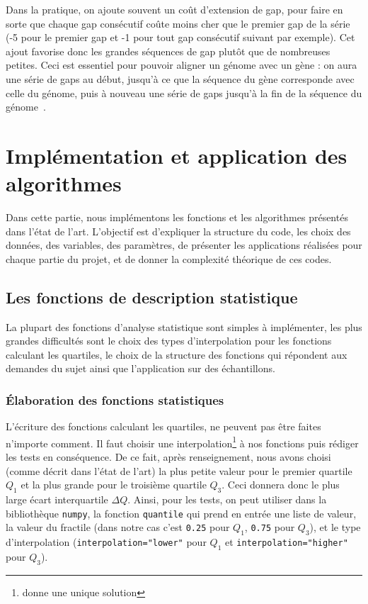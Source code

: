 \documentclass[12pt]{article}
\begin{document}
Dans la pratique, on ajoute souvent un coût d'extension de gap, pour faire en sorte que chaque gap consécutif coûte moins cher que le premier gap de la série (-5 pour le premier gap et -1 pour tout gap consécutif suivant par exemple). Cet ajout favorise donc les grandes séquences de gap plutôt que de nombreuses petites. Ceci est essentiel pour pouvoir aligner un génome avec un gène : on aura une série de gaps au début, jusqu'à ce que la séquence du gène corresponde avec celle du génome, puis à nouveau une série de gaps jusqu'à la fin de la séquence du génome~\cite{alignmit}.\\

\newpage

\section{Implémentation et application des algorithmes} 
Dans cette partie, nous implémentons les fonctions et les algorithmes présentés dans l'état de l'art. L'objectif est d'expliquer la structure du code, les choix des données, des variables, des paramètres, de présenter les applications réalisées pour chaque partie du projet, et de donner la complexité théorique de ces codes.



\subsection{Les fonctions de description statistique}
La plupart des fonctions d'analyse statistique sont simples à implémenter, les plus grandes difficultés sont le choix des types d'interpolation pour les fonctions calculant les quartiles, le choix de la structure des fonctions qui répondent aux demandes du sujet ainsi que l'application sur des échantillons.




\subsubsection{Élaboration des fonctions statistiques}
L'écriture des fonctions calculant les quartiles, ne peuvent pas être faites n'importe comment. Il faut choisir une interpolation\footnote{donne une unique solution} à nos fonctions puis rédiger les tests en conséquence. De ce fait, après renseignement, nous avons choisi (comme décrit dans l'état de l'art) la plus petite valeur pour le premier quartile $Q_1$ et la plus grande pour le troisième quartile $Q_3$. Ceci donnera donc le plus large écart interquartile $\Delta Q$. Ainsi, pour les tests, on peut utiliser dans la bibliothèque \texttt{numpy}, la fonction \texttt{quantile} qui prend en entrée une liste de valeur, la valeur du fractile (dans notre cas c'est \texttt{0.25} pour $Q_1$, \texttt{0.75} pour $Q_3$), et le type d'interpolation (\texttt{interpolation="lower"} pour $Q_1$ et \texttt{interpolation="higher"} pour $Q_3$).\\
\end{document}

